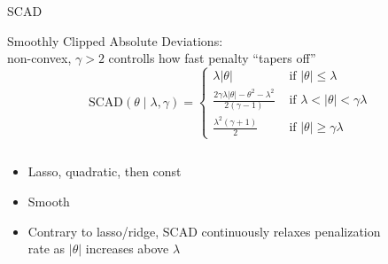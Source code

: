 \documentclass[11pt,compress,t,notes=noshow, xcolor=table]{beamer}
\begin{document}
\begin{vbframe}{SCAD }

Smoothly Clipped Absolute Deviations:\\
non-convex, $\gamma>2$ controlls how fast penalty ``tapers off''
{\footnotesize
$$
\text{SCAD}(\theta \mid \lambda, \gamma)= \begin{cases}\lambda|\theta| & \text { if }|\theta| \leq \lambda \\ \frac{2 \gamma \lambda|\theta|-\theta^2-\lambda^2}{2(\gamma-1)} & \text { if } \lambda<|\theta|<\gamma \lambda \\ \frac{\lambda^2(\gamma+1)}{2} & \text { if }|\theta| \geq \gamma \lambda\end{cases}
$$
}

\begin{columns}

\begin{column}{0.5\textwidth}

{
\begin{itemize}
    \item Lasso, quadratic, then const
    \item Smooth
    \item Contrary to lasso/ridge, SCAD continuously relaxes penalization rate as $|\theta|$ increases above $\lambda$
\end{itemize}

}
\end{column}

\begin{column}{0.5\textwidth}

\begin{figure}
      \centering
    \end{figure}


\end{column}
\end{columns}
\end{vbframe}
\end{document}
